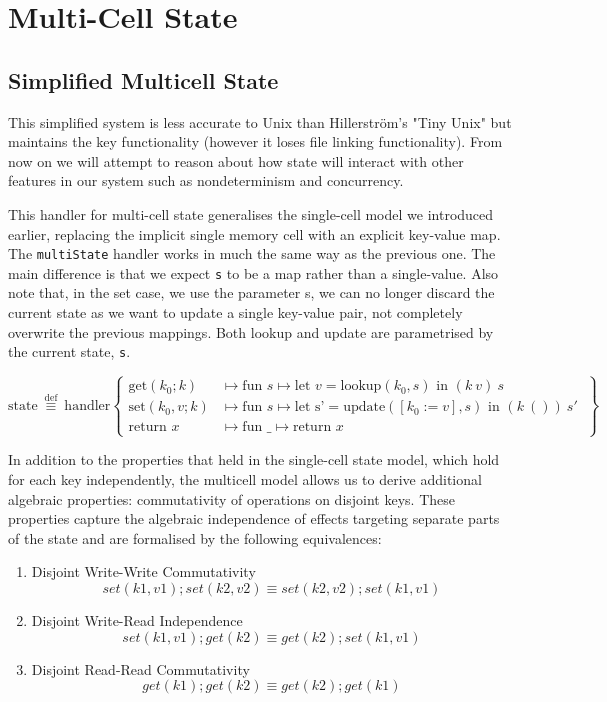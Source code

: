 \documentclass[logo,bsc,singlespacing,parskip]{infthesis}
\begin{document}
\section{Multi-Cell State}


\subsection{Simplified Multicell State}

This simplified system is less accurate to Unix than Hillerström's "Tiny Unix" but maintains the key functionality (however it loses file linking functionality). From now on we will attempt to reason about how state will interact with other features in our system such as nondeterminism and concurrency. 

This handler for multi-cell state generalises the single-cell model we introduced earlier, replacing the implicit single memory cell with an explicit key-value map. The \lstinline{multiState} handler works in much the same way as the previous one. The main difference is that we expect \lstinline{s} to be a map rather than a single-value. Also note that, in the set case, we use the parameter s, we can no longer discard the current state as we want to update a single key-value pair, not completely overwrite the previous mappings. Both lookup and update are parametrised by the current state, \lstinline{s}.

\[
\text{state} \ \overset{\text{def}}{\equiv} \ \text{handler} \left\{
\begin{array}{ll}
\text{get}(k_0; k) &\mapsto \text{fun } s \mapsto \text{let } v = \text{lookup}(k_0, s) \text{ in } (k\ v)\ s \\
\text{set}(k_0, v; k) &\mapsto \text{fun } s \mapsto \text{let s'} = \text{update}([k_0:=v],s) \text{ in } (k\ ())\ s'\ \\
\text{return } x &\mapsto \text{fun } \_ \mapsto \text{return } x
\end{array}
\right\}
\]


In addition to the properties that held in the single-cell state model, which hold for each key independently, the multicell model allows us to derive additional algebraic properties: commutativity of operations on disjoint keys. These properties capture the algebraic independence of effects targeting separate parts of the state and are formalised by the following equivalences:
\begin{enumerate}
    \item Disjoint Write-Write Commutativity
    \[set(k1,v1);set(k2,v2) \equiv set(k2,v2);set(k1,v1)\] 
    \item Disjoint Write-Read Independence
        \[set(k1,v1);get(k2) \equiv get(k2);set(k1,v1)\] 
    \item Disjoint Read-Read Commutativity
        \[get(k1);get(k2) \equiv get(k2);get(k1)\] 
\end{enumerate}
\end{document}
